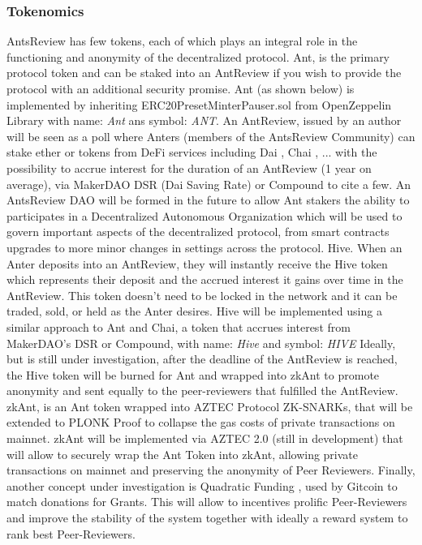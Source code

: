 \documentclass[runningheads]{llncs}
\begin{document}
\subsubsection{Tokenomics}

AntsReview has few tokens, each of which plays an integral role in the functioning and anonymity of the decentralized protocol.
\newline Ant, is the primary protocol token and can be staked into an AntReview if you wish to provide the protocol with an additional security promise.
\newline Ant (as shown below) is implemented by inheriting ERC20PresetMinterPauser.sol from OpenZeppelin Library with name: \emph{Ant} ans symbol: \emph{ANT}.
\newline An AntReview, issued by an author will be seen as a poll where Anters (members of the AntsReview Community) can stake ether or tokens from DeFi services including Dai \cite{Dai}, Chai \cite{Chai}, ... with the possibility to accrue interest for the duration of an AntReview (1 year on average), via MakerDAO DSR (Dai Saving Rate) \cite{DSR} or Compound \cite{Compound} to cite a few.
\newline An AntsReview DAO will be formed in the future to allow Ant stakers the ability to participates in a Decentralized Autonomous Organization which will be used to govern important aspects of the decentralized protocol, from smart contracts upgrades to more minor changes in settings across the protocol.
\newline Hive. When an Anter deposits into an AntReview, they will instantly receive the Hive token which represents their deposit and the accrued interest it gains over time in the AntReview.
\newline This token doesn't need to be locked in the network and it can be traded, sold, or held as the Anter desires.
\newline Hive will be implemented using a similar approach to Ant and Chai, a token that accrues interest from MakerDAO's DSR or Compound, with name: \emph{Hive} and symbol: \emph{HIVE}
\newline Ideally, but is still under investigation, after the deadline of the AntReview is reached, the Hive token will be burned for Ant and wrapped into zkAnt to promote anonymity and sent equally to the peer-reviewers that fulfilled the AntReview.
\newline zkAnt, is an Ant token wrapped into AZTEC Protocol \cite{AZTEC} ZK-SNARKs, that will be extended to PLONK \cite{PLONK} Proof to collapse the gas costs of private transactions on mainnet.
\newline zkAnt will be implemented via AZTEC 2.0 (still in development) that will allow to securely wrap the Ant Token into zkAnt, allowing private transactions on mainnet and preserving the anonymity of Peer Reviewers.
\newline Finally, another concept under investigation is Quadratic Funding \cite{LiberalRadicalism}, used by Gitcoin \cite{Gitcoin} to match donations for Grants. This will allow to incentives prolific Peer-Reviewers and improve the stability of the system together with ideally a reward system to rank best Peer-Reviewers.
\end{document}
